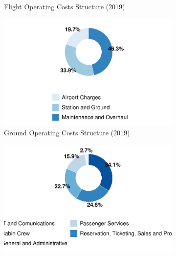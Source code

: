 \documentclass[
  11pt,
  a4paper,
]{book}
\begin{document}
\begin{figure}
\begin{minipage}[t]{0.50\linewidth}
{\begin{figure}
{}

\caption{Flight Operating Costs Structure (2019)}

\end{figure}

}

\end{minipage}%
\newline
\begin{minipage}[t]{0.50\linewidth}

{\centering 

\begin{figure}

{\centering \includegraphics{chapters/aircraft_operating_costs_files/figure-pdf/fig-ground-operating-costs-1.pdf}

}

\caption{Ground Operating Costs Structure (2019)}

\end{figure}

}

\end{minipage}%
%
\begin{minipage}[t]{0.50\linewidth}

{\centering 

\begin{figure}

{\centering \includegraphics{chapters/aircraft_operating_costs_files/figure-pdf/fig-system-operating-costs-1.pdf}

}
\end{figure}}
\end{minipage}
\end{figure}
\end{document}
